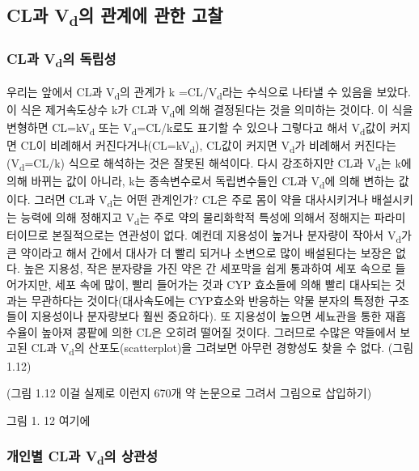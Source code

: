 \documentclass[
  11pt,
  krantz2, a4paper, twoside]{krantz}
\begin{document}
\hypertarget{cluxacfc-vduxc758-uxad00uxacc4uxc5d0-uxad00uxd55c-uxace0uxcc30}{%
\subsection{\texorpdfstring{CL과 V\textsubscript{d}의 관계에 관한 고찰}{CL과 Vd의 관계에 관한 고찰}}\label{cluxacfc-vduxc758-uxad00uxacc4uxc5d0-uxad00uxd55c-uxace0uxcc30}}

\hypertarget{cluxacfc-vduxc758-uxb3c5uxb9bduxc131}{%
\subsubsection{\texorpdfstring{CL과 V\textsubscript{d}의 독립성}{CL과 Vd의 독립성}}\label{cluxacfc-vduxc758-uxb3c5uxb9bduxc131}}

우리는 앞에서 CL과 V\textsubscript{d}의 관계가 k =CL/V\textsubscript{d}라는 수식으로 나타낼 수
있음을 보았다. 이 식은 제거속도상수 k가 CL과 V\textsubscript{d}에 의해 결정된다는 것을
의미하는 것이다. 이 식을 변형하면 CL=kV\textsubscript{d} 또는 V\textsubscript{d}=CL/k로도 표기할 수
있으나 그렇다고 해서 V\textsubscript{d}값이 커지면 CL이 비례해서 커진다거나(CL=kV\textsubscript{d}),
CL값이 커지면 V\textsubscript{d}가 비례해서 커진다는(V\textsubscript{d}=CL/k) 식으로 해석하는 것은
잘못된 해석이다. 다시 강조하지만 CL과 V\textsubscript{d}는 k에 의해 바뀌는 값이
아니라, k는 종속변수로서 독립변수들인 CL과 V\textsubscript{d}에 의해 변하는 값이다.
그러면 CL과 V\textsubscript{d}는 어떤 관계인가? CL은 주로 몸이 약을 대사시키거나
배설시키는 능력에 의해 정해지고 V\textsubscript{d}는 주로 약의 물리화학적 특성에
의해서 정해지는 파라미터이므로 본질적으로는 연관성이 없다. 예컨데
지용성이 높거나 분자량이 작아서 V\textsubscript{d}가 큰 약이라고 해서 간에서 대사가 더
빨리 되거나 소변으로 많이 배설된다는 보장은 없다. 높은 지용성, 작은
분자량을 가진 약은 간 세포막을 쉽게 통과하여 세포 속으로 들어가지만,
세포 속에 많이, 빨리 들어가는 것과 CYP 효소들에 의해 빨리 대사되는
것과는 무관하다는 것이다(대사속도에는 CYP효소와 반응하는 약물 분자의
특정한 구조들이 지용성이나 분자량보다 훨씬 중요하다). 또 지용성이 높으면
세뇨관을 통한 재흡수율이 높아져 콩팥에 의한 CL은 오히려 떨어질 것이다.
그러므로 수많은 약들에서 보고된 CL과 V\textsubscript{d}의 산포도(scatterplot)을
그려보면 아무런 경향성도 찾을 수 없다. (그림 1.12)

(그림 1.12 이걸 실제로 이런지 670개 약 논문으로 그려서 그림으로
삽입하기)

그림 1. 12 여기에

\hypertarget{uxac1cuxc778uxbcc4-cluxacfc-vduxc758-uxc0c1uxad00uxc131}{%
\subsubsection{\texorpdfstring{개인별 CL과 V\textsubscript{d}의 상관성}{개인별 CL과 Vd의 상관성}}\label{uxac1cuxc778uxbcc4-cluxacfc-vduxc758-uxc0c1uxad00uxc131}}
\end{document}
